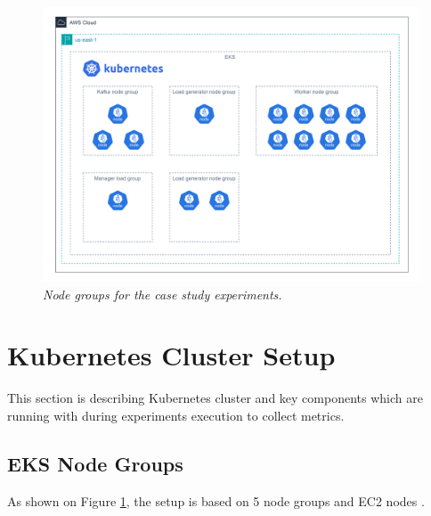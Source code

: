 \begin{figure}[ht]
    \centering
    \includegraphics[width=1\textwidth]{figures/eks-node-groups}
    \caption{\textit{Node groups for the case study experiments.}}
    \label{fig:node-gorups}
\end{figure}


\newpage
\section{Kubernetes Cluster Setup}\label{subsec:eks-cluster-configuration}
This section is describing Kubernetes cluster and key components which are running
with during experiments execution to collect metrics.

\subsection{EKS Node Groups}\label{node-groups}

As shown on Figure \ref{fig:node-gorups}, the setup is based on 5 node groups and EC2 nodes \cite{aws_node_types}.

